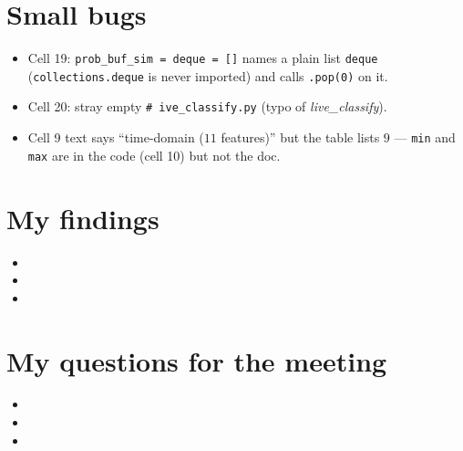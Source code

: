 \documentclass[11pt]{article}
\begin{document}
\section{Small bugs}
\begin{itemize}[noitemsep]
  \item Cell 19: \texttt{prob\_buf\_sim = deque = []} names a plain list
        \texttt{deque} (\texttt{collections.deque} is never imported) and calls
        \texttt{.pop(0)} on it.
  \item Cell 20: stray empty \texttt{\# ive\_classify.py} (typo of
        \emph{live\_classify}).
  \item Cell 9 text says ``time-domain ($11$ features)'' but the table lists $9$ ---
        \texttt{min} and \texttt{max} are in the code (cell 10) but not the doc.
\end{itemize}

\section{My findings}
\begin{itemize}[noitemsep]
  \item
  \item
  \item
\end{itemize}

\section{My questions for the meeting}
\begin{itemize}[noitemsep]
  \item
  \item
  \item
\end{itemize}
\end{document}
